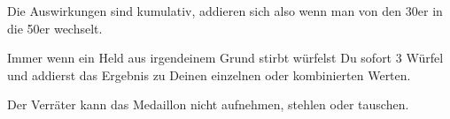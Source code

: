 Die Auswirkungen sind kumulativ, addieren sich also wenn man von den 30er in die 50er wechselt.


Immer wenn ein Held aus irgendeinem Grund stirbt würfelst Du sofort 3 Würfel und addierst das Ergebnis zu Deinen einzelnen oder kombinierten Werten.

Der Verräter kann das Medaillon nicht aufnehmen, stehlen oder tauschen.

